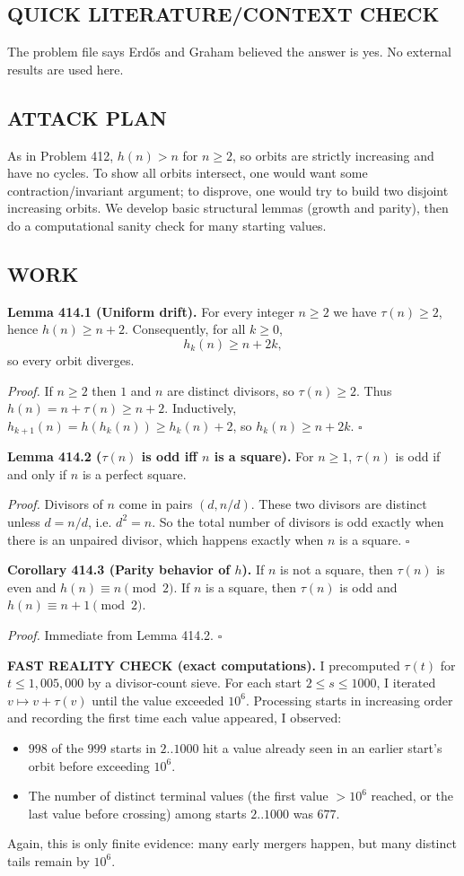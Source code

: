 \subsection*{QUICK LITERATURE/CONTEXT CHECK}
The problem file says Erd\H{o}s and Graham believed the answer is yes.
No external results are used here.

\subsection*{ATTACK PLAN}
As in Problem 412, $h(n)>n$ for $n\ge2$, so orbits are strictly increasing and have no cycles.
To show all orbits intersect, one would want some contraction/invariant argument; to disprove, one would try to build two disjoint increasing orbits.
We develop basic structural lemmas (growth and parity), then do a computational sanity check for many starting values.

\subsection*{WORK}
\textbf{Lemma 414.1 (Uniform drift).}
For every integer $n\ge2$ we have $\tau(n)\ge2$, hence $h(n)\ge n+2$.
Consequently, for all $k\ge0$,
$$h_k(n)\ge n+2k,$$
so every orbit diverges.

\textit{Proof.}
If $n\ge2$ then $1$ and $n$ are distinct divisors, so $\tau(n)\ge2$.
Thus $h(n)=n+\tau(n)\ge n+2$.
Inductively, $h_{k+1}(n)=h(h_k(n))\ge h_k(n)+2$, so $h_k(n)\ge n+2k$.
\hfill$\square$

\textbf{Lemma 414.2 ($\tau(n)$ is odd iff $n$ is a square).}
For $n\ge1$, $\tau(n)$ is odd if and only if $n$ is a perfect square.

\textit{Proof.}
Divisors of $n$ come in pairs $(d,n/d)$.
These two divisors are distinct unless $d=n/d$, i.e. $d^2=n$.
So the total number of divisors is odd exactly when there is an unpaired divisor, which happens exactly when $n$ is a square.
\hfill$\square$

\textbf{Corollary 414.3 (Parity behavior of $h$).}
If $n$ is not a square, then $\tau(n)$ is even and $h(n)\equiv n\pmod 2$.
If $n$ is a square, then $\tau(n)$ is odd and $h(n)\equiv n+1\pmod 2$.

\textit{Proof.}
Immediate from Lemma 414.2.
\hfill$\square$

\textbf{FAST REALITY CHECK (exact computations).}
I precomputed $\tau(t)$ for $t\le 1{,}005{,}000$ by a divisor-count sieve.
For each start $2\le s\le 1000$, I iterated $v\mapsto v+\tau(v)$ until the value exceeded $10^6$.
Processing starts in increasing order and recording the first time each value appeared, I observed:
\begin{itemize}
  \item $998$ of the $999$ starts in $2..1000$ hit a value already seen in an earlier start's orbit before exceeding $10^6$.
  \item The number of distinct terminal values (the first value $>10^6$ reached, or the last value before crossing) among starts $2..1000$ was $677$.
\end{itemize}
Again, this is only finite evidence: many early mergers happen, but many distinct tails remain by $10^6$.

